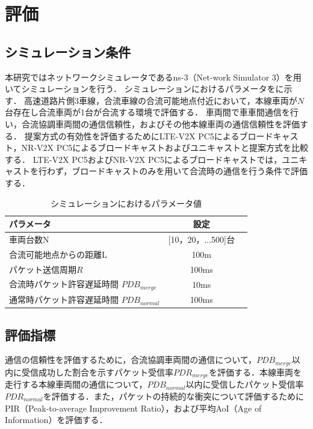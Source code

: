 \documentclass[a4paper,10pt,twocolumn,uplatex]{jsarticle}
\begin{document}
\section{評価}
\subsection{シミュレーション条件}
本研究ではネットワークシミュレータであるns-3（Net-work Simulator 3）を用いてシミュレーションを行う．
シミュレーションにおけるパラメータをに示す．
高速道路片側3車線，合流車線の合流可能地点付近において，本線車両が$N$台存在し合流車両が1台が合流する環境で評価する．
車両間で車車間通信を行い，合流協調車両間の通信信頼性，およびその他本線車両の通信信頼性を評価する．
提案方式の有効性を評価するためにLTE-V2X PC5によるブロードキャスト，NR-V2X PC5によるブロードキャストおよびユニキャストと提案方式を比較する．
LTE-V2X PC5およびNR-V2X PC5によるブロードキャストでは，ユニキャストを行わず，ブロードキャストのみを用いて合流時の通信を行う条件で評価する．
\begin{table}
  \centering
  \caption{シミュレーションにおけるパラメータ値}
  \label{tab:delay}
  \begin{tabular}{lcr}
    \hline
      パラメータ & 設定\\
    \hline \hline
      車両台数N & [10，20，...500]台 \\
      合流可能地点からの距離L & 100m \\
      パケット送信周期$R$ & 100ms \\
      合流時パケット許容遅延時間 $PDB_{merge}$ & 10ms \\
      通常時パケット許容遅延時間 $PDB_{normal}$ & 100ms \\
      
    \hline
  \end{tabular}
  \label{table:data_type}
\end{table}



\subsection{評価指標}
通信の信頼性を評価するために，合流協調車両間の通信について，$PDB_{merge}$以内に受信成功した割合を示すパケット受信率$PDR_{merge}$を評価する．本線車両を走行する本線車両間の通信について，$PDB_{normal}$以内に受信したパケット受信率$PDR_{normal}$を評価する．また，パケットの持続的な衝突について評価するためにPIR（Peak-to-average Improvement Ratio），および平均AoI（Age of Information）を評価する．
\end{document}
